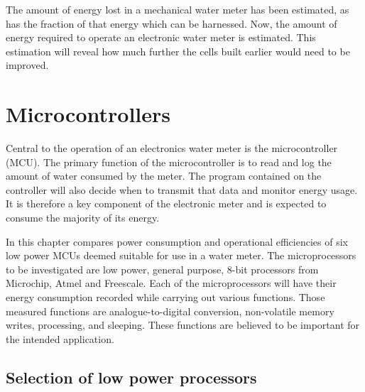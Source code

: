 
The amount of energy lost in a mechanical water meter has been estimated, as has the fraction of that energy which can be harnessed.
Now, the amount of energy required to operate an electronic water meter is estimated.
This estimation will reveal how much further the cells built earlier would need to be improved.

\section{Microcontrollers}

  Central to the operation of an electronics water meter is the microcontroller (MCU).
  The primary function of the microcontroller is to read and log the amount of water consumed by the meter.
  The program contained on the controller will also decide when to transmit that data and monitor energy usage.
  It is therefore a key component of the electronic meter and is expected to consume the majority of its energy.

  In this chapter compares power consumption and operational efficiencies of six low power MCUs deemed suitable for use in a water meter.
  The microprocessors to be investigated are low power, general purpose, 8-bit processors from Microchip, Atmel and Freescale.
  Each of the microprocessors will have their energy consumption recorded while carrying out various functions.
  Those measured functions are analogue-to-digital conversion, non-volatile memory writes, processing, and sleeping.
  These functions are believed to be important for the intended application.


  \subsection{Selection of low power processors}

